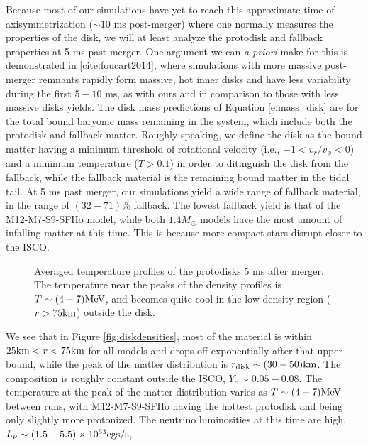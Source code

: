 Because most of our simulations have yet to reach this approximate time of axisymmetrization ($\sim 10$ ms post-merger) where one normally measures the properties of the disk, we will at least analyze the protodisk and fallback properties at 5 ms past merger.
One argument we can \textit{a priori} make for this is demonstrated in [cite:foucart2014], where simulations with more massive post-
merger remnants rapidly form massive, hot inner disks and have less variability during the first $5-10$ ms, as with ours and in comparison to those with less massive disks yields.
The disk mass predictions of Equation \ref{e:mass_disk} are for the total bound baryonic mass remaining in the system, which include both the protodisk and fallback matter.
Roughly speaking, we define the disk as the bound matter having a minimum threshold of rotational velocity (i.e., $-1 < v_r/v_\phi < 0$) and a minimum temperature ($T>0.1$) in order to ditinguish the disk from the fallback,
while the fallback material is the remaining bound matter in the tidal tail.
At 5 ms past merger, our simulations yield a wide range of fallback material, in the range of $(32 - 71)\%$ fallback.  
The lowest fallback yield is that of the M12-M7-S9-SFHo model, while both $1.4 M_\odot$ models have the most amount of infalling matter at this time.
This is because more compact stars disrupt closer to the ISCO.

\begin{figure}
	\centering
	
	\caption[Temperature profiles of the protodisks 5 ms after merger]{
		Averaged temperature profiles of the protodisks 5 ms after merger.  The temperature near the peaks of the density profiles is $T \sim (4-7) {\rm MeV}$, and becomes quite cool in the low density region ($r>75 {\rm km}$) outside the disk.  
	}
	\label{fig:disktemps}
\end{figure}

We see that in Figure \ref{fig:diskdensities}, most of the material is within 
$25 {\rm km} < r < 75{\rm km}$ for all models and drops off exponentially after that upper-bound, while the peak of the matter distribution is $r _{\rm disk} \sim (30 - 50) {\rm km}$.  
The composition is roughly constant outside the ISCO, $Y_e \sim 0.05 - 0.08$.  The temperature at the peak of the matter distribution varies as $T \sim (4-7) {\rm MeV}$ between runs, with M12-M7-S9-SFHo having the hottest protodisk and being only slightly more protonized. 
The neutrino luminosities at this time are high, $L_\nu \sim (1.5 - 5.5) \times 10^{53} {\rm egs/s}$, 



